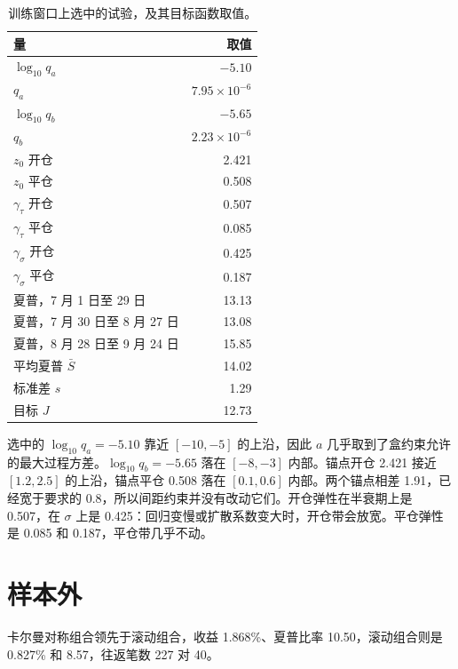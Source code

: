 \documentclass[11pt,fontset=none,scheme=plain]{ctexart}
\begin{document}
\begin{table}[ht]
\centering
\caption{训练窗口上选中的试验，及其目标函数取值。}
\label{tab:chosen}
\begin{tabular}{lr}
\toprule
量 & 取值 \\
\midrule
$\log_{10} q_a$ & $-5.10$ \\
$q_a$ & $7.95\times 10^{-6}$ \\
$\log_{10} q_b$ & $-5.65$ \\
$q_b$ & $2.23\times 10^{-6}$ \\
$z_0$ 开仓 & 2.421 \\
$z_0$ 平仓 & 0.508 \\
$\gamma_\tau$ 开仓 & 0.507 \\
$\gamma_\tau$ 平仓 & 0.085 \\
$\gamma_\sigma$ 开仓 & 0.425 \\
$\gamma_\sigma$ 平仓 & 0.187 \\
\midrule
夏普，7 月 1 日至 29 日 & 13.13 \\
夏普，7 月 30 日至 8 月 27 日 & 13.08 \\
夏普，8 月 28 日至 9 月 24 日 & 15.85 \\
平均夏普 $\bar S$ & 14.02 \\
标准差 $s$ & 1.29 \\
目标 $J$ & 12.73 \\
\bottomrule
\end{tabular}
\end{table}

选中的 $\log_{10} q_a = -5.10$ 靠近 $[-10, -5]$ 的上沿，因此 $a$ 几乎取到了盒约束允许的最大过程方差。$\log_{10} q_b = -5.65$ 落在 $[-8, -3]$ 内部。锚点开仓 2.421 接近 $[1.2, 2.5]$ 的上沿，锚点平仓 0.508 落在 $[0.1, 0.6]$ 内部。两个锚点相差 1.91，已经宽于要求的 0.8，所以间距约束并没有改动它们。开仓弹性在半衰期上是 0.507，在 $\sigma$ 上是 0.425：回归变慢或扩散系数变大时，开仓带会放宽。平仓弹性是 0.085 和 0.187，平仓带几乎不动。

\section{样本外}

卡尔曼对称组合领先于滚动组合，收益 1.868\%、夏普比率 10.50，滚动组合则是 0.827\% 和 8.57，往返笔数 227 对 40。
\end{document}
